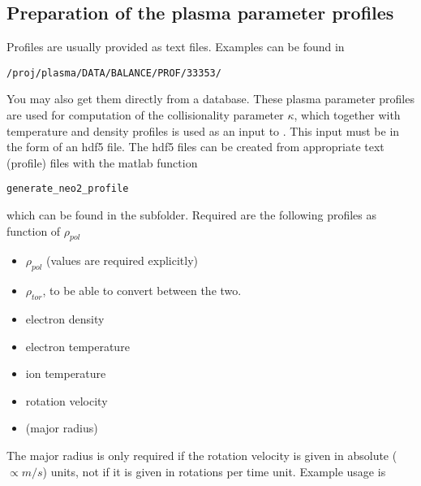 \documentclass{article}
\newcommand{\vv}[1]{\texttt{\detokenize{#1}}}
\begin{document}
\subsection{Preparation of the plasma parameter profiles\label{running_preparation_profiles}}
Profiles are usually provided as text files. Examples can be found in
\begin{verbatim}
/proj/plasma/DATA/BALANCE/PROF/33353/
\end{verbatim}
You may also get them directly from a database.
These
plasma parameter profiles are used for computation of the collisionality
parameter $\kappa$, which together with temperature and density profiles
is used as an input to \vv{NEO-2-QL}.
This input must be in the form of an hdf5 file.
The hdf5 files can be created from appropriate text (profile) files with the
matlab function
\begin{verbatim}
generate_neo2_profile
\end{verbatim}
which can be found in the \vv{OctaveScripts} subfolder.
Required are the following profiles as function of $\rho_{pol}$
\begin{itemize}
  \item $\rho_{pol}$ (values are required explicitly)
  \item $\rho_{tor}$, to be able to convert between the two.
  \item electron density
  \item electron temperature
  \item ion temperature
  \item rotation velocity
  \item (major radius)
\end{itemize}
The major radius is only required if the rotation velocity is given in
absolute ($\propto m/s$) units, not if it is given in rotations per time
unit.
Example usage is
\end{document}
